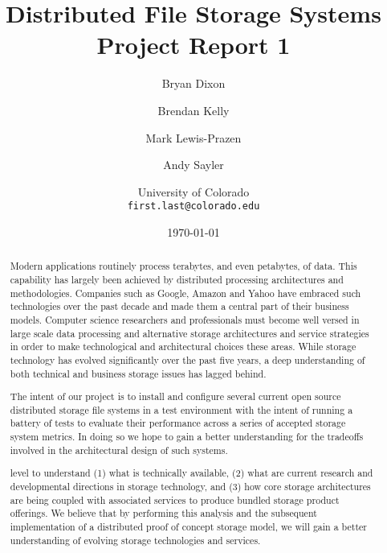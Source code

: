 \documentclass[11pt]{article}
\begin{document}
\title{
  Distributed File Storage Systems\\
  Project Report 1
}
\author{
  Bryan Dixon \and Brendan Kelly \and Mark Lewis-Prazen \and Andy Sayler\\
  \and University of Colorado\\
  \texttt{first.last@colorado.edu}
}
\date{\today}

\maketitle

\begin{abstract}
Modern applications routinely process
terabytes, and even petabytes, of data. This capability has largely been
achieved by distributed processing architectures and methodologies.
Companies such as Google, Amazon and Yahoo have embraced such
technologies over the past decade and made them a
central part of their business models. 
Computer science researchers and professionals must become well versed
in large scale data processing and alternative storage architectures
and service strategies in order to make technological and
architectural choices these areas. While storage technology has
evolved significantly over the past five years, a deep understanding
of both technical and business storage issues has lagged behind.

The intent of our project is to install and configure several current 
open source distributed storage file systems in a test environment 
with the intent of running a battery of tests to evaluate their 
performance across a series of accepted storage system metrics. In 
doing so we hope to gain a better understanding for the tradeoffs 
involved in the architectural design of such systems.

level to understand (1) what is technically available, (2) what are
current research and developmental directions in storage technology,
and (3) how core storage architectures are being coupled with
associated services to produce bundled storage product offerings.
We believe that
by performing this analysis and the subsequent implementation of a
distributed proof of concept storage model, we will gain a better
understanding of evolving storage technologies and services.

\end{abstract}

\newpage
\end{document}
